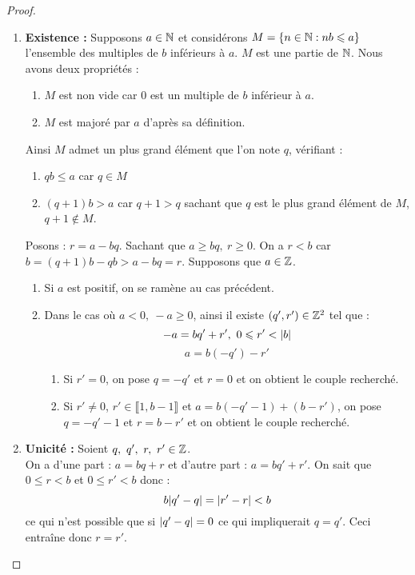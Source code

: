 \begin{proof}\cite{livre_prepa}
	\begin{enumerate}
		\item \textbf{Existence :} Supposons $a \in \mathbb{N}$ et considérons $M = \{n \in \mathbb{N} : nb \leqslant a\}$ l'ensemble des multiples de $b$ inférieurs à $a$. $M$ est une partie de $\mathbb{N}$. Nous avons deux propriétés : 
		\begin{enumerate}
			\item $M$ est non vide car 0 est un multiple de $b$ inférieur à $a$.
			\item $M$ est majoré par $a$ d'après sa définition.
		\end{enumerate}
		Ainsi $M$ admet un plus grand élément que l'on note $q$, vérifiant :
		\begin{enumerate}
			\item $qb \leq a$ car $q \in M$ 
			\item $(q + 1)b > a$ car $q + 1 > q$ sachant que $q$ est le plus grand élément de $M$, $q + 1 \notin M$.
		\end{enumerate}
		Posons : $r = a - bq$. Sachant que $a \geq bq,\ r \geq 0$. On a $r < b$ car $b = (q + 1)b - qb > a - bq = r$. Supposons que $a \in \mathbb{Z}$. 
		\begin{enumerate}
			\item Si $a$ est positif, on se ramène au cas précédent.
			\item Dans le cas où $a < 0,\ -a \geq 0$, ainsi il existe $(q', r') \in \mathbb{Z}^2$ tel que :
		\[ -a = bq' + r',\ 0 \leqslant r' < \abs{b} \]
		\[a = b(-q') - r' \]
			\begin{enumerate}
				\item Si $r' = 0$, on pose $q = -q'$ et $r = 0$ et on obtient le couple recherché.
				\item Si $r' \neq 0$, $r' \in \llbracket 1, b-1 \rrbracket$ et $a = b(-q' -1) + (b - r')$, on pose $q = -q' - 1$ et $r = b - r'$ et on obtient le couple recherché. 
			\end{enumerate}
		\end{enumerate}
		\item \textbf{Unicité :} Soient $q,\ q',\ r,\ r' \in \Z$. \\
	On a d'une part : $a = bq + r$ et d'autre part : $a = bq' + r'$.
	On sait que $0 \leq r < b$ et $0 \leq r' < b$ donc :
	\[ b \abs{q' - q} = \abs{r' - r} < b \]
	ce qui n'est possible que si $\abs{q' - q} = 0$ ce qui impliquerait $q = q'$. Ceci entraîne donc $r = r'$.
	\end{enumerate}
\end{proof}

